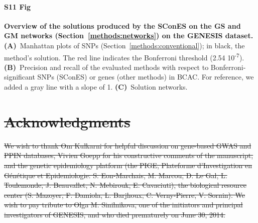 \documentclass[10pt,letterpaper]{article}
\providecommand{\DIFdeltex}[1]{{\protect\color{red}\sout{#1}}}                      %
\providecommand{\DIFdelbegin}{} %
\providecommand{\DIFdel}[1]{\texorpdfstring{\DIFdeltex{#1}}{}} %
\newcommand{\DIFscaledelfig}{0.5}
\newlength{\DIFdelgraphicswidth} %
\newlength{\DIFdelgraphicsheight} %
\newcommand{\DIFdelincludegraphics}[2][]{%
\sbox{\DIFdelgraphicsbox}{\DIFOincludegraphics[#1]{#2}}%
\settoboxwidth{\DIFdelgraphicswidth}{\DIFdelgraphicsbox} %
\settoboxtotalheight{\DIFdelgraphicsheight}{\DIFdelgraphicsbox} %
\scalebox{\DIFscaledelfig}{%
\parbox[b]{\DIFdelgraphicswidth}{\usebox{\DIFdelgraphicsbox}\\[-\baselineskip] \rule{\DIFdelgraphicswidth}{0em}}\llap{\resizebox{\DIFdelgraphicswidth}{\DIFdelgraphicsheight}{%
\setlength{\unitlength}{\DIFdelgraphicswidth}%
\begin{picture}(1,1)%
\thicklines\linethickness{2pt} %
{\color[rgb]{1,0,0}\put(0,0){\framebox(1,1){}}}%
{\color[rgb]{1,0,0}\put(0,0){\line( 1,1){1}}}%
{\color[rgb]{1,0,0}\put(0,1){\line(1,-1){1}}}%
\end{picture}%
}\hspace*{3pt}}} %
} %
\DeclareRobustCommand{\DIFdelbegin}{\DIFOdelbegin \let\includegraphics\DIFdelincludegraphics} %
\begin{document}
\paragraph*{S11 Fig}
\label{sfig:scones_gsm}
\textbf{Overview of the solutions produced by the SConES on the GS and GM networks (Section~\ref{methods:networks}) on the GENESIS dataset.} \textbf{(A)}~Manhattan plots of SNPs (Section~\ref{methods:conventional}); in black, the method’s solution. The red line indicates the Bonferroni threshold (2.54 \texttimes{} 10\textsuperscript{-7}). \textbf{(B)}~Precision and recall of the evaluated methods with respect to Bonferroni-significant SNPs (SConES) or genes (other methods) in BCAC. For reference, we added a gray line with a slope of 1. \textbf{(C)}~Solution networks.

\DIFdelbegin %

\section*{\DIFdel{Acknowledgments}}


\DIFdel{We wish to thank Om Kulkarni for helpful discussion on gene-based GWAS and PPIN databases, Vivien Goepp for his constructive comments of the manuscript, and the genetic epidemiology platform (the PIGE, Plateforme d'Investigation en Génétique et Epidemiologie: S. Eon-Marchais, M. Marcou, D. Le Gal, L. Toulemonde, J. Beauvallet, N. Mebirouk, E. Cavaciuti), the biological resource center (S. Mazoyer, F. Damiola, L. Barjhoux, C. Verny-Pierre, V. Sornin). We wish to pay tribute to Olga M. Sinilnikova, one of the initiators and principal investigators of GENESIS, and who died prematurely on June 30, 2014.}%
\end{document}
